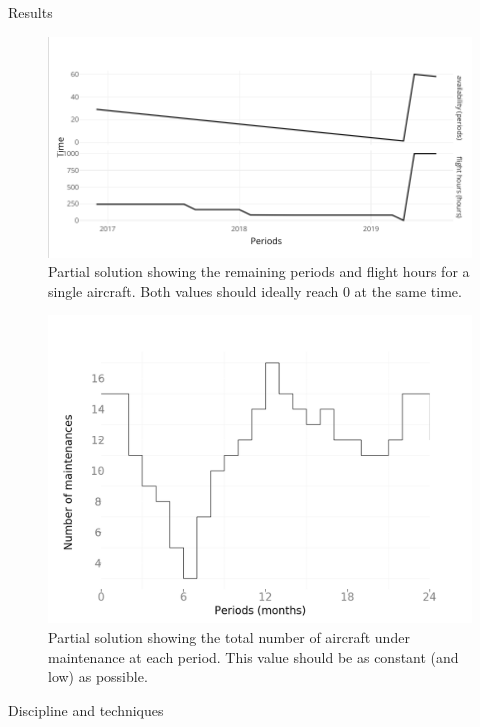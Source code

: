 \documentclass[final]{beamer}
\newlength{\onecolwid}
\begin{document}
\begin{frame}[t]
\begin{columns}[t]
\begin{column}{\onecolwid}
\begin{block}{Results}
				\begin{figure}
					\includegraphics[width=1\linewidth]{img/remaining2.png}
					\caption{Partial solution showing the remaining periods and flight hours for a single aircraft. Both values should ideally reach 0 at the same time.}
				\end{figure}	


				\begin{figure}
					
					\includegraphics[width=1\linewidth]{img/num-maintenances.png}
					\caption{Partial solution showing the total number of aircraft under maintenance at each period. This value should be as constant (and low) as possible.}
				\end{figure}
			\end{block}


		\begin{block}{Discipline and techniques}
			

\end{block}
\end{column}
\end{columns}
\end{frame}
\end{document}
